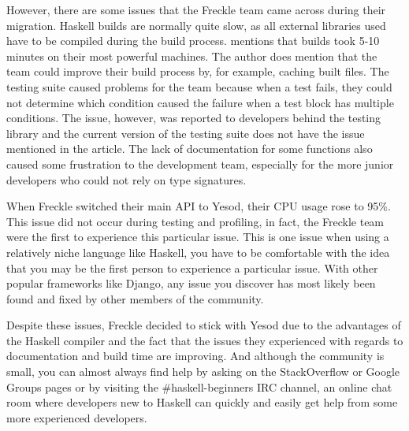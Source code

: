 However, there are some issues that the Freckle team came across during their migration.
Haskell builds are normally quite slow, as all external libraries used have to be
compiled during the build process. \citeauthor{frontrow} mentions that builds took
5-10 minutes on their most powerful machines. The author does mention that the team
could improve their build process by, for example, caching built files. The testing
suite caused problems for the team because when a test fails, they could not determine
which condition caused the failure when a test block has multiple conditions. The issue,
however, was reported to developers behind the testing library and the current
version of the testing suite does not have the issue mentioned in the article. The
lack of documentation for some functions also caused some frustration to the development
team, especially for the more junior developers who could not rely on type signatures. \parencite{frontrow}

When Freckle switched their main API to Yesod, their CPU usage rose to 95\%. This issue
did not occur during testing and profiling, in fact, the Freckle team were the first to
experience this particular issue. This is one issue when using a relatively niche language
like Haskell, you have to be comfortable with the idea that you may be the first person
to experience a particular issue. With other popular frameworks like Django, any issue
you discover has most likely been found and fixed by other members of the community.

Despite these issues, Freckle decided to stick with Yesod due to the advantages of the
Haskell compiler and the fact that the issues they experienced with regards to documentation
and build time are improving. And although the community is small, you can almost
always find help by asking on the StackOverflow or Google Groups pages or by visiting
the \#haskell-beginners IRC channel, an online chat room where developers new to Haskell
can quickly and easily get help from some more experienced developers.
